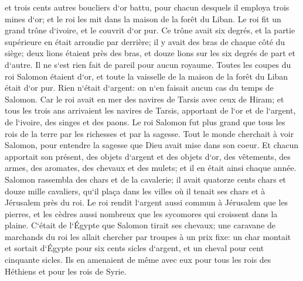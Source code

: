 \verse et trois cents autres boucliers d`or battu, pour chacun desquels il employa trois mines d`or; et le roi les mit dans la maison de la forêt du Liban. 
\verse Le roi fit un grand trône d`ivoire, et le couvrit d`or pur. 
\verse Ce trône avait six degrés, et la partie supérieure en était arrondie par derrière; il y avait des bras de chaque côté du siège; deux lions étaient près des bras, 
\verse et douze lions sur les six degrés de part et d`autre. Il ne s`est rien fait de pareil pour aucun royaume. 
\verse Toutes les coupes du roi Salomon étaient d`or, et toute la vaisselle de la maison de la forêt du Liban était d`or pur. Rien n`était d`argent: on n`en faisait aucun cas du temps de Salomon. 
\verse Car le roi avait en mer des navires de Tarsis avec ceux de Hiram; et tous les trois ans arrivaient les navires de Tarsis, apportant de l`or et de l`argent, de l`ivoire, des singes et des paons. 
\verse Le roi Salomon fut plus grand que tous les rois de la terre par les richesses et par la sagesse. 
\verse Tout le monde cherchait à voir Salomon, pour entendre la sagesse que Dieu avait mise dans son coeur. 
\verse Et chacun apportait son présent, des objets d`argent et des objets d`or, des vêtements, des armes, des aromates, des chevaux et des mulets; et il en était ainsi chaque année. 
\verse Salomon rassembla des chars et de la cavalerie; il avait quatorze cents chars et douze mille cavaliers, qu`il plaça dans les villes où il tenait ses chars et à Jérusalem près du roi. 
\verse Le roi rendit l`argent aussi commun à Jérusalem que les pierres, et les cèdres aussi nombreux que les sycomores qui croissent dans la plaine. 
\verse C`était de l`Égypte que Salomon tirait ses chevaux; une caravane de marchands du roi les allait chercher par troupes à un prix fixe: 
\verse un char montait et sortait d`Égypte pour six cents sicles d`argent, et un cheval pour cent cinquante sicles. Ils en amenaient de même avec eux pour tous les rois des Héthiens et pour les rois de Syrie. 

\chapter{}

